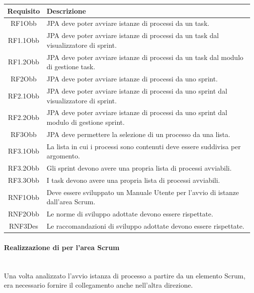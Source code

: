 \begin{tabular}{| c | p{10cm} |}

\hline
\textbf{Requisito} & \textbf{Descrizione} \\
\hline
RF1Obb &
JPA deve poter avviare istanze di processi da un task. \\
\hline
RF1.1Obb &
JPA deve poter avviare istanze di processi da un task dal visualizzatore di
sprint. \\
\hline
RF1.2Obb &
JPA deve poter avviare istanze di processi da un task dal modulo di gestione
task. \\
\hline
RF2Obb &
JPA deve poter avviare istanze di processi da uno sprint. \\
\hline
RF2.1Obb &
JPA deve poter avviare istanze di processi da uno sprint dal visualizzatore di
sprint. \\
\hline
RF2.2Obb &
JPA deve poter avviare istanze di processi da uno sprint dal modulo di gestione
sprint. \\
\hline
RF3Obb &
JPA deve permettere la selezione di un processo da una lista. \\
\hline
RF3.1Obb &
La lista in cui i processi sono contenuti deve essere suddivisa per argomento.
\\
\hline
RF3.2Obb &
Gli sprint devono avere una propria lista di processi avviabili. \\
\hline
RF3.3Obb &
I task devono avere una propria lista di processi avviabili. \\
\hline
RNF1Obb &
Deve essere sviluppato un Manuale Utente per l'avvio di istanze dall'area
Scrum.
\\
\hline
RNF2Obb &
Le norme di sviluppo adottate devono essere rispettate.
\\
\hline
RNF3Des &
Le raccomandazioni di sviluppo adottate devono essere rispettate.
\\
\hline
\end{tabular}
\label{tab:requisiti-istanze}

\paragraph{Realizzazione di  per l'area Scrum} \mbox{} \\

Una volta analizzato l'avvio istanza di processo a partire da un elemento
Scrum, era necessario fornire il collegamento anche nell'altra direzione.

